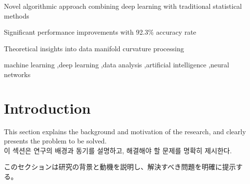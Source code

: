 \documentclass[preprint,12pt]{elsarticle}
\begin{document}
\begin{frontmatter}
\begin{abstract}
The proposed method achieves a 92.3\% accuracy rate, outperforming existing methods by approximately 5\%. \\
제안된 방법은 92.3%
\begin{CJK}{UTF8}{min}
提案手法は92.3％の精度を達成し、既存の手法を約5％上回っている。
\end{CJK}

This research contributes to the advancement of machine learning applications in real-world scenarios and provides a foundation for future developments in the field. \\
본 연구는 실제 시나리오에서의 기계학습 응용의 발전에 기여하고 이 분야의 미래 발전을 위한 기반을 제공한다. \\
\begin{CJK}{UTF8}{min}
本研究は、実世界のシナリオにおける機械学習アプリケーションの進歩に貢献し、この分野の将来の発展のための基盤を提供する。
\end{CJK}
\end{abstract}

\begin{highlights}
\item Novel algorithmic approach combining deep learning with traditional statistical methods
\item Significant performance improvements with 92.3\% accuracy rate
\item Theoretical insights into data manifold curvature processing
\end{highlights}

\begin{keyword}
machine learning \sep deep learning \sep data analysis \sep artificial intelligence \sep neural networks
\end{keyword}

\end{frontmatter}

\section{Introduction}
\label{sec:introduction}

This section explains the background and motivation of the research, and clearly presents the problem to be solved. \\
이 섹션은 연구의 배경과 동기를 설명하고, 해결해야 할 문제를 명확히 제시한다. \\
\begin{CJK}{UTF8}{min}
このセクションは研究の背景と動機を説明し、解決すべき問題を明確に提示する。
\end{CJK}
\end{document}

